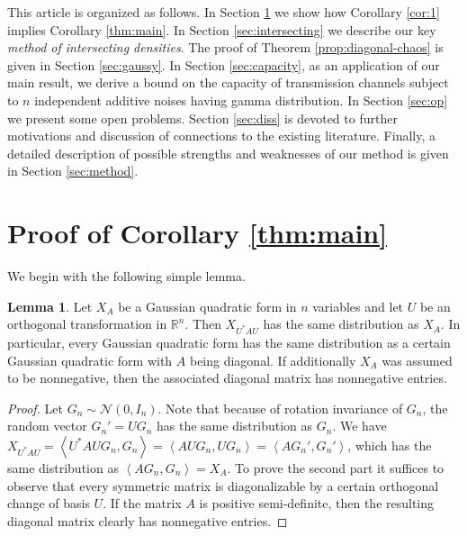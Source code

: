 \documentclass[11pt]{amsart}
\newcommand{\mc}[1]{\mathcal{{#1}}}
\newcommand{\1}{\mathbf{1}}
\newcommand{\R}{\mathbb{R}}
\newcommand{\scal}[2]{\left\langle #1, #2\right\rangle}
\theoremstyle{definition}
\newtheorem{lemma}{Lemma}
\theoremstyle{definition}
\theoremstyle{remark}
\begin{document}







This article is organized as follows. In Section \ref{sec:reduction} we show how Corollary \ref{cor:1} implies Corollary \ref{thm:main}. In Section \ref{sec:intersecting} we describe our key \emph{method of intersecting densities}. The proof of Theorem \ref{prop:diagonal-chaos} is given in Section \ref{sec:gaussy}. In Section \ref{sec:capacity}, as an application of our main result,  we derive a bound on the capacity of transmission channels subject to $n$ independent additive noises having gamma distribution. In Section \ref{sec:op} we present some open problems.  Section \ref{sec:diss} is devoted to further motivations and discussion of connections to the existing literature. Finally, a detailed description of possible strengths and weaknesses of our method is given in Section \ref{sec:method}.  

\section{Proof of Corollary \ref{thm:main}}\label{sec:reduction}

We begin with the following simple lemma.

\begin{lemma}\label{lem:rotation}
Let $X_A$ be a Gaussian quadratic form in $n$ variables and let $U$ be an orthogonal transformation in $\R^n$. Then $X_{U^\ast A U}$ has the same distribution as $X_A$. In particular, every Gaussian quadratic form has the same distribution as a certain Gaussian quadratic form with $A$ being diagonal. If additionally $X_A$ was assumed to be nonnegative, then the associated diagonal matrix has nonnegative entries.
\end{lemma}

\begin{proof}
Let $G_n \sim \mc{N}(0,I_n)$. Note that because of rotation invariance of $G_n$, the random vector $G_n'=U G_n$ has the same distribution as $G_n$. We have $X_{U^\ast A U} = \scal{U^\ast A U G_n}{G_n} = \scal{A U G_n}{U G_n} =\scal{A G_n'}{G_n'}$, which has the same distribution as $\scal{AG_n}{G_n}=X_A$. To prove the second part it suffices to observe that every symmetric matrix is diagonalizable by a certain orthogonal change of basis $U$. If the matrix $A$ is positive semi-definite, then the resulting diagonal matrix clearly has nonnegative entries.


\end{proof}
\end{document}
